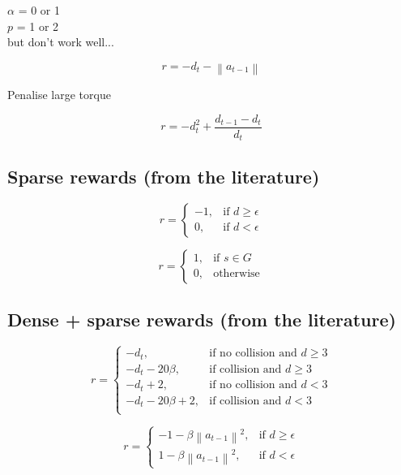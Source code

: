 \documentclass{article}
\newcommand{\norm}[1]{\left\lVert#1\right\rVert}
\begin{document}
$\alpha$ = 0 or 1 \\
$p$ = 1 or 2 \\
but don't work well...

\begin{equation}
r = - d_t -  \norm{a_{t-1}}
\end{equation}

Penalise large torque

\begin{equation}
r = - d_t^2+ \frac{d_{t-1} - d_t}{d_t}
\end{equation}

\subsection{Sparse rewards (from the literature)}

\begin{equation}
r = \begin{cases}
    -1, & \text{if $d \geq \epsilon $}\\
    0, & \text{if $d < \epsilon $}
  \end{cases}
\end{equation}

\begin{equation}
r = \begin{cases}
    1, & \text{if $s \in G $}\\
    0, & \text{otherwise}
  \end{cases}
\end{equation}


\subsection{Dense + sparse rewards (from the literature)}

\begin{equation}
r = \begin{cases}
    -d_t, & \text{if no collision and $d \geq 3$}\\
    -d_t - 20\beta , & \text{if collision and $d \geq 3$}\\
    -d_t + 2 , & \text{if no collision and $d < 3$} \\
    -d_t - 20\beta + 2, & \text{if collision and $d < 3$}\\
  \end{cases}
\end{equation}

\begin{equation}
r = \begin{cases}
    - 1 - \beta \norm{a_{t-1}}^2, & \text{if $d \geq \epsilon $}\\
    1 - \beta \norm{a_{t-1}}^2, & \text{if $d < \epsilon $}
  \end{cases}
\end{equation}
\end{document}
